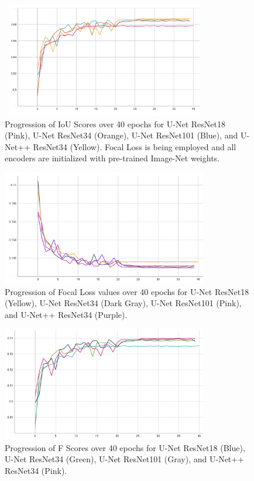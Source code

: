 \documentclass[conference]{IEEEtran}
\begin{document}
\begin{figure}[!h]
    \includegraphics[width=9cm, height=5cm]{images/encoders/encoders_iou.png}
    \caption{Progression of IoU Scores over 40 epochs for U-Net ResNet18 (Pink), U-Net ResNet34 (Orange), U-Net ResNet101 (Blue), and U-Net++ ResNet34 (Yellow). Focal Loss is being employed and all encoders are initialized with pre-trained Image-Net weights.}
\end{figure}



\begin{figure}[!h]
    \includegraphics[width=9cm, height=5cm]{images/encoders/encoders_focalloss.png}
    \caption{Progression of Focal Loss values over 40 epochs for U-Net ResNet18 (Yellow), U-Net ResNet34 (Dark Gray), U-Net ResNet101 (Pink), and U-Net++ ResNet34 (Purple).}
\end{figure}

\begin{figure}[!h]
    \includegraphics[width=9cm, height=5cm]{images/encoders/encoders_fscore.png}
    \caption{Progression of F Scores over 40 epochs for U-Net ResNet18 (Blue), U-Net ResNet34 (Green), U-Net ResNet101 (Gray), and U-Net++ ResNet34 (Pink). }
\end{figure}
\end{document}
